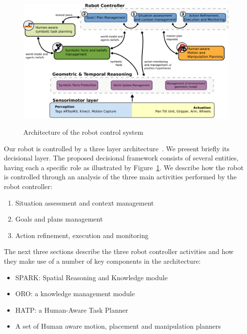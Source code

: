 \documentclass{svmult}
\begin{document}
\begin{figure}[thpb]
  \centering
  \includegraphics[width=1.0\textwidth]{./figs/architecture-overview.pdf} \\
  \caption {Architecture of the robot control system}
  \label{architecture_fg}
\end{figure}
 
Our robot is controlled by a three layer
architecture~\cite{Alami1998}.  We present briefly its decisional
layer. The proposed decisional framework consists of several entities,
having each a specific role as illustrated by
Figure~\ref{architecture_fg}.  We describe how the robot is controlled
through an analysis of the three main activities performed by the
robot controller:

\begin {enumerate}
	\item Situation assessment and context management 
	\item Goals and plans management
	\item Action refinement, execution and monitoring
\end {enumerate}

The next three sections describe the three robot controller
activities and how they make use of a number of key components in the
architecture:


\begin{itemize}
\item SPARK: Spatial Reasoning and Knowledge module \cite{Sisbot2011}
\item ORO: a knowledge management module \cite{Lemaignan2010}
\item HATP: a Human-Aware Task Planner \cite{Alili2008}
\item A set of Human aware motion, placement and manipulation planners
 \cite{Sisbot2008, Mainprice2011, Pandey2010}
\end{itemize}
\end{document}
